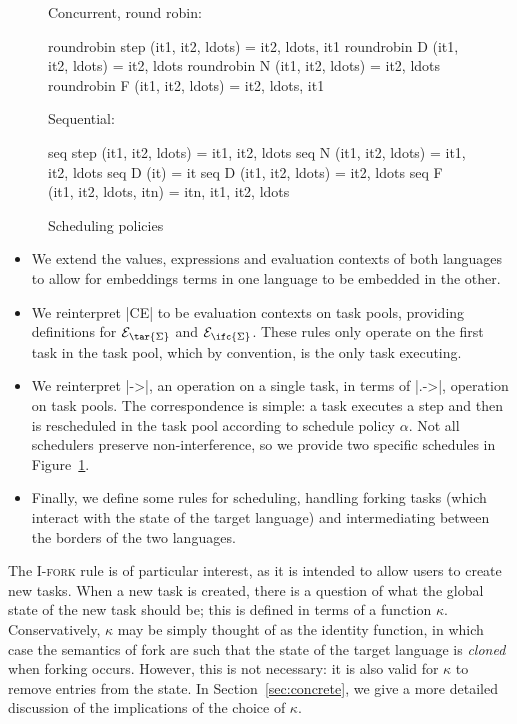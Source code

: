 \begin{figure}
  Concurrent, round robin:
\begin{code}
  roundrobin step (it1, it2, ldots)  = it2, ldots, it1
  roundrobin D (it1, it2, ldots)     = it2, ldots
  roundrobin N (it1, it2, ldots)     = it2, ldots
  roundrobin F (it1, it2, ldots)     = it2, ldots, it1
\end{code}
  Sequential:
\begin{code}
  seq step (it1, it2, ldots)     = it1, it2, ldots
  seq N (it1, it2, ldots)        = it1, it2, ldots
  seq D (it)                     = it
  seq D (it1, it2, ldots)        = it2, ldots
  seq F (it1, it2, ldots, itn)   = itn, it1, it2, ldots
\end{code}
\caption{Scheduling policies}
\label{fig:scheduler}
\end{figure}

\begin{itemize}
    \item We extend the values, expressions and evaluation contexts of both languages to allow for embeddings terms in one language to be embedded in the other.
    \item We reinterpret |CE| to be evaluation contexts on task pools, providing definitions for $\mathcal{E}_{\tar{\Sigma}}$ and $\mathcal{E}_{\ifc{\Sigma}}$.  These rules only operate on the first task in the task pool, which by convention, is the only task executing.
    \item We reinterpret |->|, an operation on a single task, in terms of |.->|, operation on task pools.  The correspondence is simple: a task executes a step and then is rescheduled in the task pool according to schedule policy $\alpha$.  Not all schedulers preserve non-interference, so we provide two specific schedules in Figure~\ref{fig:scheduler}.
    \item Finally, we define some rules for scheduling, handling forking tasks (which interact with the state of the target language) and intermediating between the borders of the two languages.
\end{itemize}

The \textsc{I-fork} rule is of particular interest, as it is intended to allow users
to create new tasks.  When a new task is created, there is a question of what the
global state of the new task should be; this is defined in terms of a function $\kappa$.
Conservatively, $\kappa$ may be simply thought of as the identity function, in which
case the semantics of fork are such that the state of the target language is \emph{cloned}
when forking occurs.  However, this is not necessary: it is also valid for $\kappa$
to remove entries from the state.  In Section~\ref{sec:concrete}, we give a more detailed
discussion of the implications of the choice of $\kappa$.

